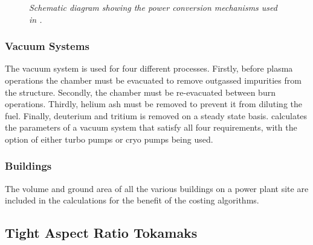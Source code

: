 \begin{figure}
\centerline{}
\vspace{-12mm}
\caption[PWRCONV]
{\it Schematic diagram showing the power conversion mechanisms used in \PS
\cite[Note 0166]{PWF}.}
\label{fig:pwrconv}
\end{figure}

\subsubsection{Vacuum Systems}
The vacuum system is used for four different processes. Firstly, before plasma
operations the chamber must be evacuated to remove outgassed impurities from
the structure. Secondly, the chamber must be re-evacuated between burn
operations. Thirdly, helium ash must be removed to prevent it from diluting
the fuel. Finally, deuterium and tritium is removed on a steady state
basis. \PS calculates the parameters of a vacuum system that satisfy all four
requirements, with the option of either turbo pumps or cryo pumps being used.

\subsubsection{Buildings}
The volume and ground area of all the various buildings on a power plant site
are included in the \PS calculations for the benefit of the costing
algorithms.

\subsection{Tight Aspect Ratio Tokamaks}


